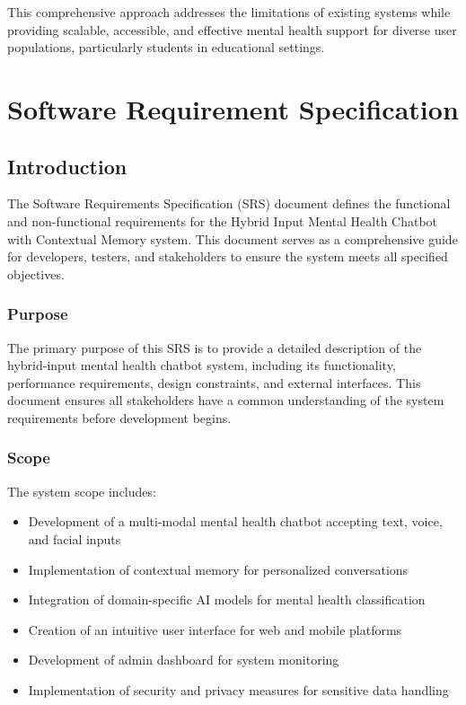 \documentclass[11pt]{report}
\begin{document}
This comprehensive approach addresses the limitations of existing systems while providing scalable, accessible, and effective mental health support for diverse user populations, particularly students in educational settings.

\chapter{Software Requirement Specification}
\section{Introduction}
The Software Requirements Specification (SRS) document defines the functional and non-functional requirements for the Hybrid Input Mental Health Chatbot with Contextual Memory system. This document serves as a comprehensive guide for developers, testers, and stakeholders to ensure the system meets all specified objectives.

\subsection{Purpose}
The primary purpose of this SRS is to provide a detailed description of the hybrid-input mental health chatbot system, including its functionality, performance requirements, design constraints, and external interfaces. This document ensures all stakeholders have a common understanding of the system requirements before development begins.

\subsection{Scope}
The system scope includes:
\begin{itemize}
    \item Development of a multi-modal mental health chatbot accepting text, voice, and facial inputs
    \item Implementation of contextual memory for personalized conversations
    \item Integration of domain-specific AI models for mental health classification
    \item Creation of an intuitive user interface for web and mobile platforms
    \item Development of admin dashboard for system monitoring
    \item Implementation of security and privacy measures for sensitive data handling
\end{itemize}
\end{document}
